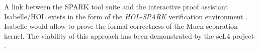 A link between the SPARK tool suite and the interactive proof assistant
Isabelle/HOL exists in the form of the \emph{HOL-SPARK} verification
environment \cite{berghofer:OASIcs:2012:3587}. Isabelle would allow to prove
the formal correctness of the Muen separation kernel. The viability of this
approach has been demonstrated by the seL4 project \cite{Klein_EHACDEEKNSTW_09}.
